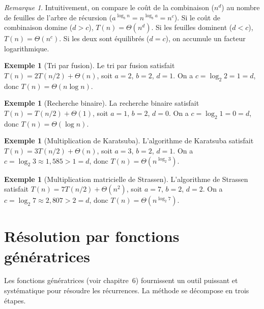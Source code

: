 \documentclass[12pt,a4paper,openany]{book}
\theoremstyle{definition}
\newtheorem{exemple}[definition]{Exemple}
\theoremstyle{plain}
\theoremstyle{remark}
\newtheorem{remarque}[definition]{Remarque}
\begin{document}
\begin{remarque}
Intuitivement, on compare le coût de la combinaison ($n^d$) au nombre de
feuilles de l'arbre de récursion ($a^{\log_b n} = n^{\log_b a} = n^c$).
Si le coût de combinaison domine ($d > c$), $T(n) = \Theta(n^d)$.
Si les feuilles dominent ($d < c$), $T(n) = \Theta(n^c)$.
Si les deux sont équilibrés ($d = c$), on accumule un facteur logarithmique.
\end{remarque}

\begin{exemple}[Tri par fusion]
\label{ex:tri-fusion}
Le tri par fusion satisfait $T(n) = 2T(n/2) + \Theta(n)$, soit $a = 2$,
$b = 2$, $d = 1$. On a $c = \log_2 2 = 1 = d$, donc
$T(n) = \Theta(n \log n)$.
\end{exemple}

\begin{exemple}[Recherche binaire]
\label{ex:rech-binaire}
La recherche binaire satisfait $T(n) = T(n/2) + \Theta(1)$, soit $a = 1$,
$b = 2$, $d = 0$. On a $c = \log_2 1 = 0 = d$, donc
$T(n) = \Theta(\log n)$.
\end{exemple}

\begin{exemple}[Multiplication de Karatsuba]
\label{ex:karatsuba}
L'algorithme de Karatsuba satisfait $T(n) = 3T(n/2) + \Theta(n)$, soit
$a = 3$, $b = 2$, $d = 1$. On a $c = \log_2 3 \approx 1{,}585 > 1 = d$,
donc $T(n) = \Theta(n^{\log_2 3})$.
\end{exemple}

\begin{exemple}[Multiplication matricielle de Strassen]
\label{ex:strassen}
L'algorithme de Strassen satisfait $T(n) = 7T(n/2) + \Theta(n^2)$, soit
$a = 7$, $b = 2$, $d = 2$. On a $c = \log_2 7 \approx 2{,}807 > 2 = d$,
donc $T(n) = \Theta(n^{\log_2 7})$.
\end{exemple}

\section{Résolution par fonctions génératrices}
\label{sec:rec-gen}

Les fonctions génératrices (voir chapitre~6) fournissent un outil puissant et
systématique pour résoudre les récurrences. La méthode se décompose en trois
étapes.
\end{document}
